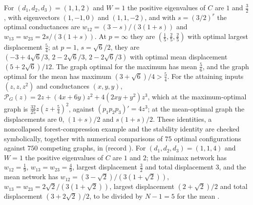 For $(d_1,d_2,d_3)=(1,1,2)$ and $W=1$ the positive eigenvalues of $C$ are $1$ and $\tfrac32$, with
eigenvectors $(1,-1,0)$ and $(1,1,-2)$, and with $s=(3/2)^r$ the optimal conductances are
$w_{12}=(3-s)/(3(1+s))$ and $w_{13}=w_{23}=2s/(3(1+s))$. At $p=\infty$ they are
$(\tfrac15,\tfrac25,\tfrac25)$ with optimal largest displacement $\tfrac54$; at $p=1$,
$s=\sqrt6/2$, they are $(-3+4\sqrt6/3,\,2-2\sqrt6/3,\,2-2\sqrt6/3)$ with optimal mean displacement
$(5+2\sqrt6)/12$. The graph optimal for the maximum has mean $\tfrac56$, and the graph optimal for the
mean has maximum $(3+\sqrt6)/4>\tfrac54$. For the attaining inputs $(z,z,z^2)$ and conductances
$(x,y,y)$, $\mathcal P_G(z)=2z+(4x+6y)z^2+4(2xy+y^2)z^3$, which at the maximum-optimal graph is
$\tfrac{32}{25}z(z+\tfrac54)^2$, against $(p_1p_2p_3)'=4z^3$; at the mean-optimal graph the
displacements are $0$, $(1+s)/2$ and $s(1+s)/2$. These identities, a noncollapsed
forest-compression example and the stability identity are checked symbolically, together with
numerical comparisons of $75$ optimal configurations against $750$ competing graphs, in
 (record
). For
$(d_1,d_2,d_3)=(1,1,4)$ and $W=1$ the positive eigenvalues of $C$ are $1$ and $2$; the minimax network has
$w_{12}=\tfrac19$, $w_{13}=w_{23}=\tfrac49$, largest displacement $\tfrac32$ and total displacement $3$,
and the mean network has $w_{12}=(3-\sqrt2)/(3(1+\sqrt2))$, $w_{13}=w_{23}=2\sqrt2/(3(1+\sqrt2))$, largest
displacement $(2+\sqrt2)/2$ and total displacement $(3+2\sqrt2)/2$, to be divided by $N-1=5$ for the
mean .


